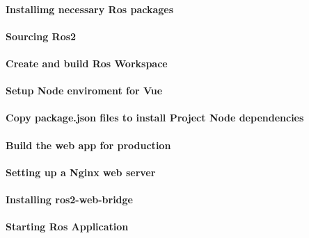\paragraph*{Installimg necessary Ros packages}

\paragraph*{Sourcing Ros2}

\paragraph*{Create and build Ros Workspace}

\paragraph{Setup Node enviroment for Vue}

\paragraph{Copy package.json files to install Project Node dependencies}

\paragraph*{Build the web app for production}

\paragraph{Setting up a Nginx web server}

\paragraph*{Installing ros2-web-bridge}

\paragraph{Starting Ros Application}


